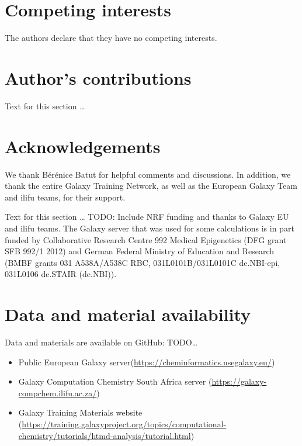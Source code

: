 \documentclass[twocolumn]{bmcart}%
\begin{document}
\begin{backmatter}

\section*{Competing interests}
  The authors declare that they have no competing interests.

\section*{Author's contributions}
    Text for this section \ldots

\section*{Acknowledgements}
We thank Bérénice Batut for helpful comments and discussions. In addition, we thank the entire Galaxy Training Network, as well as the European Galaxy Team and ilifu teams, for their support. 

Text for this section \ldots
  TODO: Include NRF funding and thanks to Galaxy EU and ilifu teams.
The Galaxy server that was used for some calculations is in part funded by Collaborative Research Centre 992 Medical Epigenetics (DFG grant SFB 992/1 2012) and German Federal Ministry of Education and Research (BMBF grants 031 A538A/A538C RBC, 031L0101B/031L0101C de.NBI-epi, 031L0106 de.STAIR (de.NBI)).
\section*{Data and material availability}
  Data and materials are available on GitHub:
  TODO\ldots
  \begin{itemize}
  \item   Public European Galaxy server(\url{https://cheminformatics.usegalaxy.eu/}) 
  \item Galaxy Computation Chemistry South Africa server (\url{https://galaxy-compchem.ilifu.ac.za/})
  \item Galaxy Training Materials website (\url{https://training.galaxyproject.org/topics/computational-chemistry/tutorials/htmd-analysis/tutorial.html})
\end{itemize}




\end{backmatter}
\end{document}

